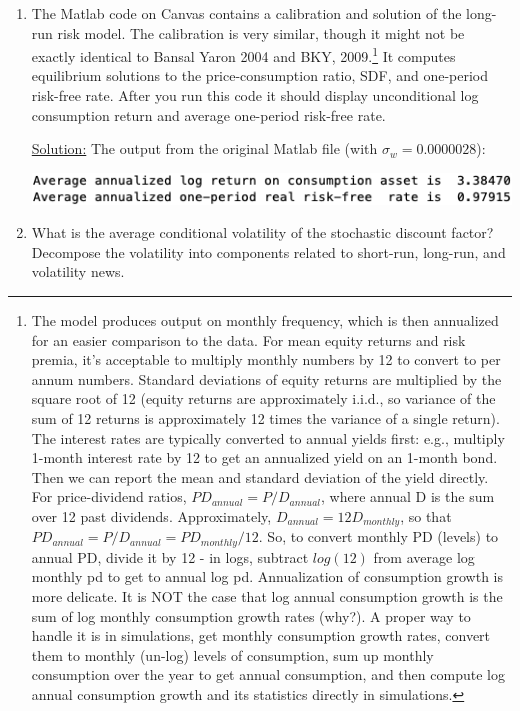 \documentclass{article}
\begin{document}
\begin{enumerate}

\item The Matlab code on Canvas contains a calibration and solution of the long-run risk model. The calibration is very similar, though it might not be exactly identical to Bansal Yaron 2004 and BKY, 2009.\footnote{The model produces output on monthly frequency, which is then annualized for an easier comparison to the data. For mean equity returns and risk premia, it’s acceptable to multiply monthly numbers by 12 to convert to per annum numbers. Standard deviations of equity returns are multiplied by the square root of 12 (equity returns are approximately i.i.d., so variance of the sum of 12 returns is approximately 12 times the variance of a single return). The interest rates are typically converted to annual yields first: e.g., multiply 1-month interest rate by 12 to get an annualized yield on an 1-month bond. Then we can report the mean and standard deviation of the yield directly. For price-dividend ratios, $PD_{annual} = P/D_{annual}$, where annual D is the sum over 12 past dividends. Approximately, $D_{annual} = 12D_{monthly}$, so that $PD_{annual} = P/D_{annual} = PD_{monthly}/12$. So, to convert monthly PD (levels) to annual PD, divide it by 12 - in logs, subtract $log(12)$ from average log monthly pd to get to annual log pd. Annualization of consumption growth is more delicate. It is NOT the case that log annual consumption growth is the sum of log monthly consumption growth rates (why?). A proper way to handle it is in simulations, get monthly consumption growth rates, convert them to monthly (un-log) levels of consumption, sum up monthly consumption over the year to get annual consumption, and then compute log annual consumption growth and its statistics directly in simulations.} It computes equilibrium solutions to the price-consumption ratio, SDF, and one-period risk-free rate. After you run this code it should display unconditional log consumption return and average one-period risk-free rate.

\bigskip

\underline{Solution:}  The output from the original Matlab file (with $\sigma_w = 0.0000028$):

\includegraphics[scale = 0.75]{p4_output_1}

\bigskip

\item  What is the average conditional volatility of the stochastic discount factor? Decompose the volatility into components related to short-run, long-run, and volatility news.


\end{enumerate}
\end{document}
